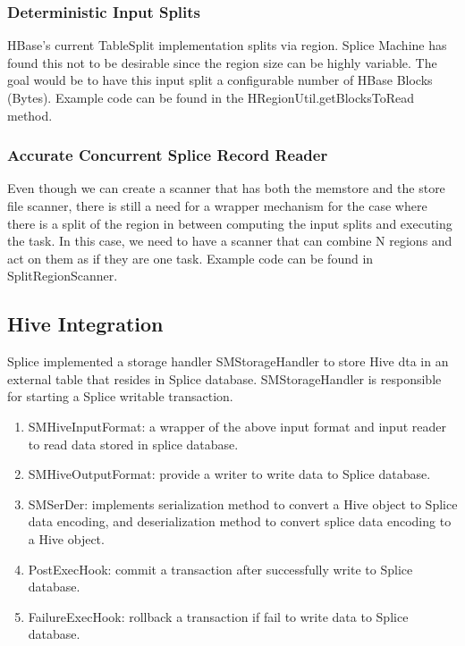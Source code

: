 \subsubsection{Deterministic Input Splits}
HBase's current TableSplit implementation splits via region.  Splice Machine has
found this not to be desirable since the region size can be highly variable. 
The goal would be to have this input split a configurable number of HBase
Blocks (Bytes).  Example code can be found in the HRegionUtil.getBlocksToRead
method.

\subsubsection{Accurate Concurrent Splice Record Reader}
Even though we can create a scanner that has both the memstore and the store
file scanner, there is still a need for a wrapper mechanism for the case where
there is a split of the region in between computing the input splits and executing the
task.  In this case, we need to have a scanner that can combine N regions and
act on them as if they are one task.  Example code can be found in
SplitRegionScanner.

\subsection{Hive Integration}
Splice implemented a storage handler SMStorageHandler to store Hive dta in an external table that resides in Splice database. SMStorageHandler is responsible for starting a Splice writable transaction. 
\begin{enumerate}
	\item SMHiveInputFormat: a wrapper of the above input format and input reader to read data stored in splice database.
	\item SMHiveOutputFormat: provide a writer to write data to Splice database.
	\item SMSerDer: implements serialization method to convert a Hive object to Splice data encoding, and deserialization method to convert splice data encoding to a Hive object.
	\item PostExecHook: commit a transaction after successfully write to Splice database.
	\item FailureExecHook: rollback a transaction if fail to write data to Splice database.
\end{enumerate}

